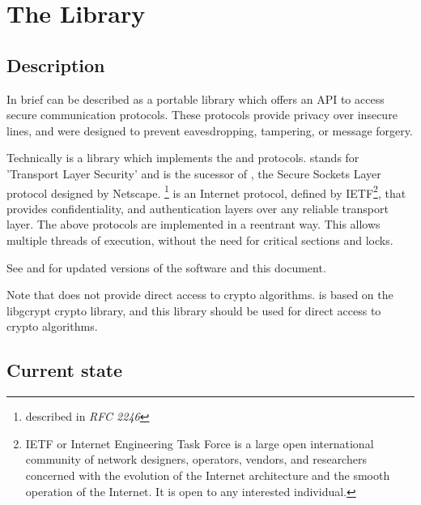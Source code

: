 \chapter{The Library}

\section{Description}
\par
In brief \gnutls{} can be described as a portable library which offers
an API to access secure communication protocols. These protocols provide
privacy over insecure lines, and were designed to prevent 
eavesdropping, tampering, or message forgery.

\par
Technically \gnutls{} is a library which implements the \tlsI{} and 
\sslIII{} protocols. \tls{} stands for 'Transport Layer Security' and is the sucessor of \ssl{}, 
the Secure Sockets Layer protocol designed by Netscape. 
\tlsI{}\footnote{described in {\it RFC 2246}} is an Internet protocol,
defined by {IETF}\footnote{IETF or Internet Engineering Task Force 
is a large open international community of network
designers, operators, vendors, and researchers concerned with the evolution of 
the Internet architecture and the smooth operation of the Internet. It is open to any interested individual.}, 
that provides confidentiality, and authentication layers over any reliable
transport layer.
The above protocols are implemented in a reentrant way. 
This allows multiple threads of execution, without the need for critical 
sections and locks. 

\par
See 
and  
for updated versions of the \gnutls{} software and this document.

\par Note that \gnutls{} does not provide direct access to crypto algorithms.
\gnutls{} is based on the 
libgcrypt
crypto library, and this library should be used for direct access to crypto
algorithms.

\section{Current state}

